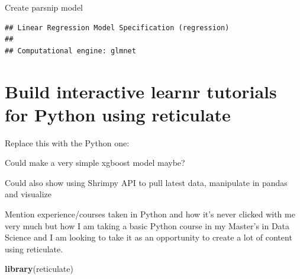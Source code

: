 \documentclass[
]{book}
\newenvironment{Shaded}{\begin{snugshade}}{\end{snugshade}}
\newcommand{\CommentTok}[1]{\textcolor[rgb]{0.56,0.35,0.01}{\textit{#1}}}
\newcommand{\KeywordTok}[1]{\textcolor[rgb]{0.13,0.29,0.53}{\textbf{#1}}}
\newcommand{\NormalTok}[1]{#1}
\newcommand{\OperatorTok}[1]{\textcolor[rgb]{0.81,0.36,0.00}{\textbf{#1}}}
\newcommand{\StringTok}[1]{\textcolor[rgb]{0.31,0.60,0.02}{#1}}
\begin{document}
Create parsnip model

\begin{Shaded}
\end{Shaded}

\begin{verbatim}
## Linear Regression Model Specification (regression)
## 
## Computational engine: glmnet
\end{verbatim}

\begin{Shaded}
\end{Shaded}

\hypertarget{build-interactive-learnr-tutorials-for-python-using-reticulate}{%
\section{Build interactive learnr tutorials for Python using reticulate}\label{build-interactive-learnr-tutorials-for-python-using-reticulate}}

Replace this with the Python one:

Could make a very simple xgboost model maybe?

Could also show using Shrimpy API to pull latest data, manipulate in pandas and visualize

Mention experience/courses taken in Python and how it's never clicked with me very much but how I am taking a basic Python course in my Master's in Data Science and I am looking to take it as an opportunity to create a lot of content using reticulate.

\begin{Shaded}
\begin{Highlighting}[]
\KeywordTok{library}\NormalTok{(reticulate)}
\end{Highlighting}
\end{Shaded}

  
\end{document}

